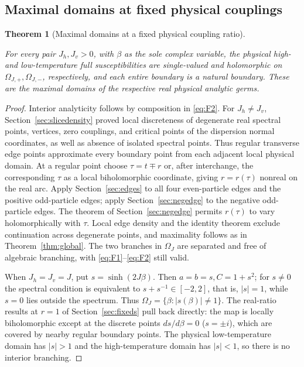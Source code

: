 \documentclass[11pt,a4paper]{article}
\numberwithin{equation}{section}
\theoremstyle{plain}
\newtheorem{theorem}{Theorem}[section]
\theoremstyle{definition}
\begin{document}
\subsection{Maximal domains at fixed physical couplings}\label{sec:slicenb}

\begin{theorem}[Maximal domains at a fixed physical coupling ratio]\label{thm:slice}

For every pair \(J_h,J_v>0\), with \(\beta\) as the sole complex variable, the physical high- and low-temperature full susceptibilities are single-valued and holomorphic on \(\Omega_{J,+},\Omega_{J,-}\), respectively, and each entire boundary is a natural boundary. These are the maximal domains of the respective real physical analytic germs.

\end{theorem}

\begin{proof}

Interior analyticity follows by composition in \eqref{eq:F2}. For \(J_h\ne J_v\), Section~\ref{sec:slicedensity} proved local discreteness of degenerate real spectral points, vertices, zero couplings, and critical points of the dispersion normal coordinates, as well as absence of isolated spectral points. Thus regular transverse edge points approximate every boundary point from each adjacent local physical domain. At a regular point choose \(\tau=t\mp r\) or, after interchange, the corresponding \(\tau\) as a local biholomorphic coordinate, giving \(r=r(\tau)\) nonreal on the real arc. Apply Section~\ref{sec:edges} to all four even-particle edges and the positive odd-particle edges; apply Section~\ref{sec:negedge} to the negative odd-particle edges. The theorem of Section~\ref{sec:negedge} permits \(r(\tau)\) to vary holomorphically with \(\tau\). Local edge density and the identity theorem exclude continuation across degenerate points, and maximality follows as in Theorem~\ref{thm:global}. The two branches in \(\Omega_J\) are separated and free of algebraic branching, with \eqref{eq:F1}--\eqref{eq:F2} still valid.

When \(J_h=J_v=J\), put \(s=\sinh(2J\beta)\). Then \(a=b=s,C=1+s^2\); for \(s\ne0\) the spectral condition is equivalent to \(s+s^{-1}\in[-2,2]\), that is, \(|s|=1\), while \(s=0\) lies outside the spectrum. Thus \(\Omega_J=\{\beta:|s(\beta)|\ne1\}\). The real-ratio results at $r=1$ of Section~\ref{sec:fixeds} pull back directly: the map is locally biholomorphic except at the discrete points \(ds/d\beta=0\) (\(s=\pm i\)), which are covered by nearby regular boundary points. The physical low-temperature domain has \(|s|>1\) and the high-temperature domain has \(|s|<1\), so there is no interior branching.

\end{proof}
\end{document}
